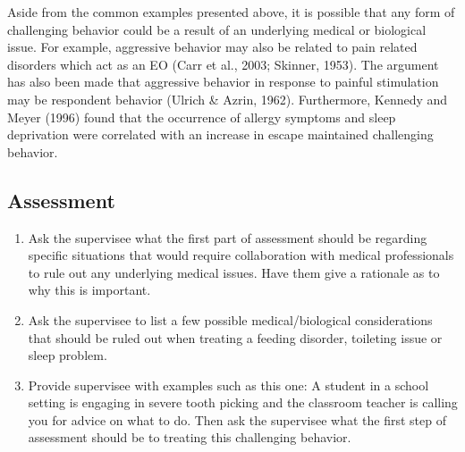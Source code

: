 Aside from the common examples presented above, it is possible that any form of challenging behavior could be a result of an underlying medical or biological issue. For example, aggressive behavior may also be related to pain related disorders which act as an EO (Carr et al., 2003; Skinner, 1953). The argument has also been made that aggressive behavior in response to painful stimulation may be respondent behavior (Ulrich \& Azrin, 1962). Furthermore, Kennedy and Meyer (1996) found that the occurrence of allergy symptoms and sleep deprivation were correlated with an increase in escape maintained challenging behavior. 

\subsection{Assessment}
\begin{enumerate}
\item Ask the supervisee what the first part of assessment should be regarding specific situations that would require collaboration with medical professionals to rule out any underlying medical issues. Have them give a rationale as to why this is important. 
\item Ask the supervisee to list a few possible medical/biological considerations that should be ruled out when treating a feeding disorder, toileting issue or sleep problem.
\item Provide supervisee with examples such as this one: A student in a school setting is engaging in severe tooth picking and the classroom teacher is calling you for advice on what to do. Then ask the supervisee what the first step of assessment should be to treating this challenging behavior. 
%
\end{enumerate}
%
